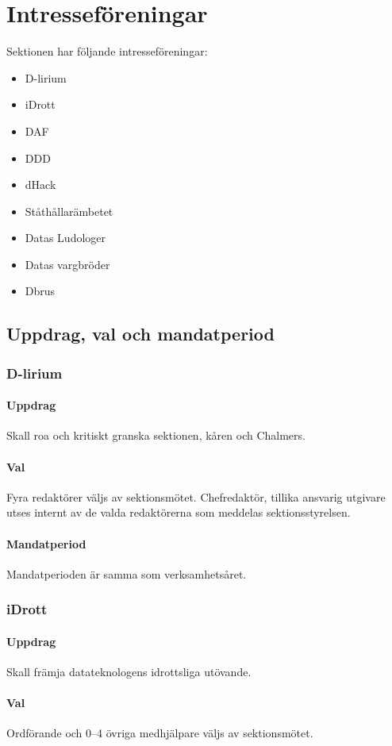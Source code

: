 \section{Intresseföreningar}
Sektionen har följande intresseföreningar:
\begin{itemize}
  \item D-lirium 
  \item iDrott 
  \item DAF 
  \item DDD
  \item dHack
  \item Ståthållarämbetet
  \item Datas Ludologer 
  \item Datas vargbröder
  \item Dbrus
\end{itemize}
\subsection{Uppdrag, val och mandatperiod}
\subsubsection{D-lirium}
\paragraph{Uppdrag}
Skall roa och kritiskt granska sektionen, kåren och Chalmers. 
\paragraph{Val}
Fyra redaktörer väljs av sektionsmötet. Chefredaktör, tillika ansvarig utgivare utses internt av de valda redaktörerna som meddelas sektionsstyrelsen. 
\paragraph{Mandatperiod}
Mandatperioden är samma som verksamhetsåret. 
\subsubsection{iDrott}
\paragraph{Uppdrag}
Skall främja datateknologens idrottsliga utövande. 
\paragraph{Val}
Ordförande och 0--4 övriga medhjälpare väljs av sektionsmötet. 
